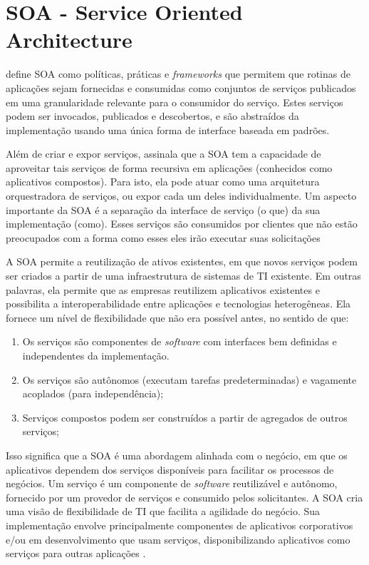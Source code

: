 \section{SOA - Service Oriented Architecture}\label{sec:soa}

 define SOA como políticas, práticas e \textit{frameworks} que permitem que rotinas de aplicações sejam fornecidas e consumidas como conjuntos de serviços publicados em uma granularidade relevante para o consumidor do serviço. Estes serviços podem ser invocados, publicados e descobertos, e são abstraídos da implementação usando uma única forma de interface baseada em padrões.

Além de criar e expor serviços,  assinala que a SOA tem a capacidade de aproveitar tais serviços de forma recursiva em aplicações (conhecidos como aplicativos compostos). Para isto, ela pode atuar como uma arquitetura orquestradora de serviços, ou expor cada um deles individualmente. Um aspecto importante da SOA é a separação da interface de serviço (o que) da sua implementação (como). Esses serviços são consumidos por clientes que não estão preocupados com a forma como esses eles irão executar suas solicitações

 A SOA permite a reutilização de ativos existentes, em que novos serviços podem ser criados a partir de uma infraestrutura de sistemas de TI existente. Em outras palavras, ela permite que as empresas reutilizem aplicativos existentes e possibilita a interoperabilidade entre aplicações e tecnologias heterogêneas. Ela fornece um nível de flexibilidade que não era possível antes, no sentido de que:

 \begin{enumerate}[label=\alph*)]
    \item Os serviços são componentes de \textit{software} com interfaces bem definidas e independentes da implementação.
    \item Os serviços são autônomos (executam tarefas predeterminadas) e vagamente acoplados (para independência);
    \item Serviços compostos podem ser construídos a partir de agregados de outros serviços;
\end{enumerate}

Isso significa que a SOA é uma abordagem alinhada com o negócio, em que os aplicativos dependem dos serviços disponíveis para facilitar os processos de negócios. Um serviço é um componente de \textit{software} reutilizável e autônomo, fornecido por um provedor de serviços e consumido pelos solicitantes. A SOA cria uma visão de flexibilidade de TI que facilita a agilidade do negócio. Sua implementação envolve principalmente componentes de aplicativos corporativos e/ou em desenvolvimento que usam serviços, disponibilizando aplicativos como serviços para outras aplicações \cite{soa-book}.

